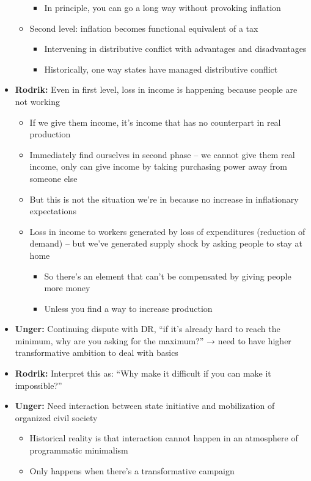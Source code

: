 \begin{itemize}
\begin{itemize}
    \begin{itemize}
    \tightlist
    \item
      In principle, you can go a long way without provoking inflation
    \end{itemize}
  \item
    Second level: inflation becomes functional equivalent of a tax

    \begin{itemize}
    \tightlist
    \item
      Intervening in distributive conflict with advantages and
      disadvantages
    \item
      Historically, one way states have managed distributive conflict
    \end{itemize}
  \end{itemize}
\item
  \textbf{Rodrik:} Even in first level, loss in income is happening
  because people are not working

  \begin{itemize}
  \tightlist
  \item
    If we give them income, it's income that has no counterpart in real
    production
  \item
    Immediately find ourselves in second phase -- we cannot give them
    real income, only can give income by taking purchasing power away
    from someone else
  \item
    But this is not the situation we're in because no increase in
    inflationary expectations
  \item
    Loss in income to workers generated by loss of expenditures
    (reduction of demand) -- but we've generated supply shock by asking
    people to stay at home

    \begin{itemize}
    \tightlist
    \item
      So there's an element that can't be compensated by giving people
      more money
    \item
      Unless you find a way to increase production
    \end{itemize}
  \end{itemize}
\item
  \textbf{Unger:} Continuing dispute with DR, ``if it's already hard to
  reach the minimum, why are you asking for the maximum?'' → need to
  have higher transformative ambition to deal with basics
\item
  \textbf{Rodrik:} Interpret this as: ``Why make it difficult if you can
  make it impossible?''
\item
  \textbf{Unger:} Need interaction between state initiative and
  mobilization of organized civil society

  \begin{itemize}
  \tightlist
  \item
    Historical reality is that interaction cannot happen in an
    atmosphere of programmatic minimalism
  \item
    Only happens when there's a transformative campaign
  \end{itemize}
\end{itemize}

